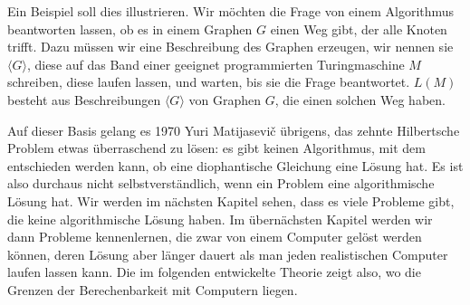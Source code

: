 Ein Beispiel soll dies illustrieren. Wir möchten die Frage
von einem Algorithmus beantworten lassen, ob es in einem Graphen $G$
einen Weg gibt, der alle Knoten trifft.  Dazu müssen wir eine
Beschreibung des Graphen erzeugen, wir nennen sie $\langle G\rangle$,
diese auf das Band einer geeignet programmierten Turingmaschine $M$ schreiben,
diese laufen lassen, und warten, bis sie die Frage beantwortet. $L(M)$
besteht aus Beschreibungen $\langle G\rangle$ von Graphen $G$, die
einen solchen Weg haben.

Auf dieser Basis gelang es 1970 Yuri Matijasevi\v c übrigens,
%
das zehnte Hilbertsche Problem etwas überraschend zu lösen: es gibt
keinen Algorithmus, mit dem entschieden werden kann, ob eine
diophantische Gleichung eine Lösung hat. Es ist also durchaus
nicht selbstverständlich, wenn ein Problem eine algorithmische
Lösung hat. Wir werden im nächsten Kapitel sehen, dass es viele
Probleme gibt, die keine algorithmische Lösung haben. Im übernächsten
Kapitel werden wir dann Probleme kennenlernen, die zwar von einem Computer
gelöst werden können, deren Lösung aber länger dauert als man
jeden realistischen Computer laufen lassen kann.
Die im folgenden entwickelte Theorie zeigt also, wo die Grenzen
der Berechenbarkeit mit Computern liegen.
